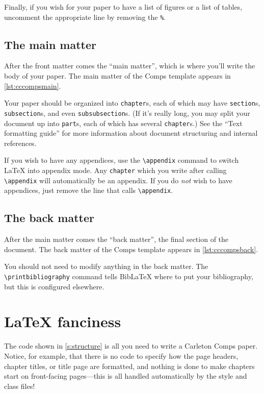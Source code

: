\documentclass[twoside]{memoir}
\newcommand{\code}[1]{\texttt{#1}}
\begin{document}
Finally, if you wish for your paper to have a list of figures or a list of tables, uncomment the appropriate line by removing the \code{\%}.

\subsection{The main matter}
\label{s:mainmatter}
After the front matter comes the \enquote{main matter}, which is where you'll write the body of your paper.
The main matter of the Comps template appears in \cref{lst:cccompsmain}.



Your paper should be organized into \code{chapter}s, each of which may have \code{section}s, \code{subsection}s, and even \code{subsubsection}s.
(If it's really long, you may split your document up into \code{part}s, each of which has several \code{chapter}s.)
See the \enquote{Text formatting guide} for more information about document structuring and internal references.

If you wish to have any appendices, use the \code{\textbackslash{}appendix} command to switch \LaTeX{} into appendix mode.
Any \code{chapter} which you write after calling \code{\textbackslash{}appendix} will automatically be an appendix.
If you do \emph{not} wish to have appendices, just remove the line that calls \code{\textbackslash{}appendix}.

\subsection{The back matter}
\label{s:backmatter}
After the main matter comes the \enquote{back matter}, the final section of the document.
The back matter of the Comps template appears in \cref{lst:cccompsback}.



You should not need to modify anything in the back matter.
The \code{\textbackslash{}printbibliography} command tells Bib\LaTeX{} where to put your bibliography, but this is configured elsewhere.

\section{\LaTeX{} fanciness}
\label{s:fanciness}
The code shown in \cref{s:structure} is all you need to write a Carleton Comps paper.
Notice, for example, that there is no code to specify how the page headers, chapter titles, or title page are formatted, and nothing is done to make chapters start on front-facing pages---this is all handled automatically by the style and class files!
\end{document}
